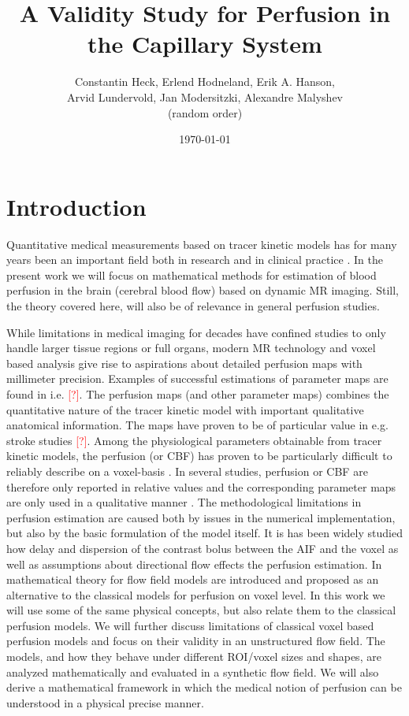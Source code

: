 \documentclass[paper=a4, fontsize=11pt,parskip=half,headings=small]{scrartcl}
\title{A Validity Study for Perfusion in the Capillary System}
\author{Constantin Heck, Erlend Hodneland, Erik A. Hanson, \\ Arvid Lundervold, Jan Modersitzki, Alexandre Malyshev \\ (random order)}
\date{\today}
\newcommand{\missingsource}{\textcolor{red}{[?]}}
\begin{document}
	\maketitle
	\tableofcontents

	
	\section{Introduction}
	
	Quantitative medical measurements based on tracer kinetic models has for many years been an important field both in research and in clinical practice \cite{zierler62,axel80,zierler00}. 
	In the present work we will focus on mathematical methods for estimation of blood perfusion in the brain (cerebral blood flow) based on dynamic MR imaging. 
	Still, the theory covered here, will also be of relevance in general perfusion studies.

	While limitations in medical imaging for decades have confined studies to only handle larger tissue regions or full organs, modern MR technology and voxel based analysis give rise to aspirations about detailed perfusion maps with millimeter precision.  
	Examples of successful estimations of parameter maps are found in i.e. \missingsource. 
	The perfusion maps (and other parameter maps) combines the quantitative nature of the tracer kinetic model with important qualitative anatomical information. 
	The maps have proven to be of particular value in e.g. stroke studies \missingsource. 
	Among the physiological parameters obtainable from tracer kinetic models, the perfusion (or CBF) has proven to be particularly difficult to reliably describe on a voxel-basis \cite{kudo10}.  
	In several studies, perfusion or CBF are therefore only reported in relative values and the corresponding parameter maps are only used in a qualitative manner \cite{calamante99}.
	The methodological limitations in perfusion estimation are caused both by issues in the numerical implementation, but also by the basic formulation of the model itself.  
	It is has been widely studied how delay and dispersion of the contrast bolus between the AIF and the voxel as well as assumptions about directional flow \cite{thacker03,sourbron14} effects the perfusion estimation. 
	In \cite{sourbron14} mathematical theory for flow field models are introduced and proposed as an alternative to the classical models for perfusion on voxel level. 
	In this work we will use some of the same physical concepts, but also relate them to the classical perfusion models.  
	We will further discuss limitations of classical voxel based perfusion models and focus on their validity in an unstructured flow field.
	The models, and how they behave under different ROI/voxel sizes and shapes, are analyzed mathematically and evaluated in a synthetic flow field.  
	We will also derive a mathematical framework in which the medical notion of perfusion can be understood in a physical precise manner.
\end{document}
